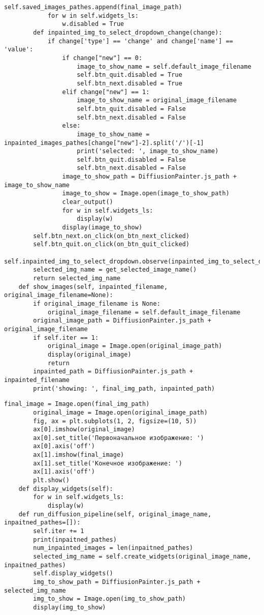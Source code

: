 \begin{lstlisting}[basicstyle=\ttfamily\small]
            self.saved_images_pathes.append(final_image_path)
            for w in self.widgets_ls:
                w.disabled = True
        def inpainted_img_to_select_dropdown_change(change):
            if change['type'] == 'change' and change['name'] == 'value':
                if change["new"] == 0:
                    image_to_show_name = self.default_image_filename
                    self.btn_quit.disabled = True
                    self.btn_next.disabled = True
                elif change["new"] == 1:
                    image_to_show_name = original_image_filename
                    self.btn_quit.disabled = False
                    self.btn_next.disabled = False
                else:
                    image_to_show_name = inpainted_images_pathes[change["new"]-2].split('/')[-1]
                    print('selected: ', image_to_show_name)
                    self.btn_quit.disabled = False
                    self.btn_next.disabled = False
                image_to_show_path = DiffiusionPainter.js_path + image_to_show_name
                image_to_show = Image.open(image_to_show_path)
                clear_output()
                for w in self.widgets_ls:
                    display(w)
                display(image_to_show)
        self.btn_next.on_click(on_btn_next_clicked)
        self.btn_quit.on_click(on_btn_quit_clicked)
       self.inpainted_img_to_select_dropdown.observe(inpainted_img_to_select_dropdown_change)
        selected_img_name = get_selected_image_name()
        return selected_img_name
    def show_images(self, inpainted_filename, original_image_filename=None):
        if original_image_filename is None:
            original_image_filename = self.default_image_filename
        original_image_path = DiffiusionPainter.js_path +  original_image_filename
        if self.iter == 1:
            original_image = Image.open(original_image_path)
            display(original_image)
            return
        inpainted_path = DiffiusionPainter.js_path + inpainted_filename
        print('showing: ', final_img_path, inpainted_path)
                \end{lstlisting}
\begin{lstlisting}[basicstyle=\ttfamily\small]
        final_image = Image.open(final_img_path)
        original_image = Image.open(original_image_path)
        fig, ax = plt.subplots(1, 2, figsize=(10, 5))
        ax[0].imshow(original_image)
        ax[0].set_title('Первоначальное изображение: ')
        ax[0].axis('off')
        ax[1].imshow(final_image)
        ax[1].set_title('Конечное изображение: ')
        ax[1].axis('off')
        plt.show()
    def display_widgets(self):
        for w in self.widgets_ls:
            display(w)
    def run_diffusion_pipeline(self, original_image_name, inpaitned_pathes=[]):
        self.iter += 1
        print(inpaitned_pathes)
        num_inpainted_images = len(inpaitned_pathes)
        selected_img_name = self.create_widgets(original_image_name, inpaitned_pathes)
        self.display_widgets()
        img_to_show_path = DiffiusionPainter.js_path + selected_img_name
        img_to_show = Image.open(img_to_show_path)
        display(img_to_show)
\end{lstlisting}

